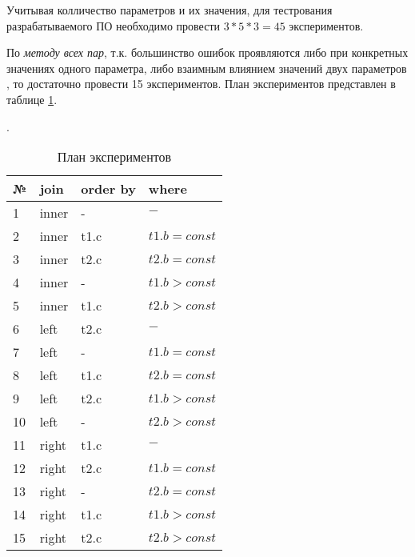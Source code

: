 Учитывая колличество параметров и их значения, для тестрования разрабатываемого ПО необходимо провести $3 * 5 * 3 = 45$ экспериментов.

По \textit{методу всех пар}, т.к. большинство ошибок проявляются либо при конкретных значениях одного параметра, либо взаимным влиянием значений двух параметров \cite{article:Telcordia}, то достаточно провести 15 экспериментов. План экспериментов представлен в таблице \ref{table:list_experiments}.

\begin{table}[h]
\caption{План экспериментов}\label{table:list_experiments}.
\medskip
\begin{tabular}{|l|l|l|l|}
\hline
№ & join & order by & where\\
\hline
1 & inner & - & $-$\\\hline
2 & inner & t1.c & $t1.b = const$\\\hline
3 & inner & t2.c & $t2.b = const$\\\hline
4 & inner & - & $t1.b > const$\\\hline
5 & inner & t1.c & $t2.b > const$\\\hline
6 & left & t2.c & $-$\\\hline
7 & left & - & $t1.b = const$\\\hline
8 & left & t1.c & $t2.b = const$\\\hline
9 & left & t2.c & $t1.b > const$\\\hline
10 & left & - & $t2.b > const$\\\hline
11 & right & t1.c & $-$\\\hline
12 & right & t2.c & $t1.b = const$\\\hline
13 & right & - & $t2.b = const$\\\hline
14 & right & t1.c & $t1.b > const$\\\hline
15 & right & t2.c & $t2.b > const$\\\hline
\end{tabular}
\end{table}
